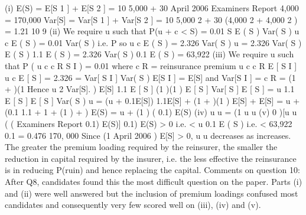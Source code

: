 \documentclass[a4paper,12pt]{article}
\begin{document}
(i)
E(S) = E[S 1 ] + E[S 2 ]
= 10 5,000 + 30
April 2006
Examiners Report
4,000 = 170,000
Var[S] = Var[S 1 ] + Var[S 2 ]
= 10 5,000 2 + 30 (4,000 2 + 4,000 2 )
= 1.21 10 9
(ii)
We require u such that
P(u + c < S) = 0.01
S E ( S )
Var( S )
u c E ( S )
= 0.01
Var( S )
i.e. P
so u c E ( S )
= 2.326
Var( S )
u = 2.326 Var( S )
E ( S ) 1.1 E ( S )
= 2.326 Var( S ) 0.1 E ( S )
= 63,922
(iii)
We require u such that
P ( u
c c R
S I ) = 0.01
where c R = reinsurance premium
u
c c R E [ S I ]
u c E [ S ]
= 2.326 =
Var[ S I ]
Var( S )
E[S I ] = E[S] and Var[S I ] =
c R = (1 + )(1
Hence
u
2 Var[S].
) E[S]
1.1 E [ S ] (1
)(1 ) E [ S ]
Var[ S ]
E [ S ]
=
u 1.1 E [ S ] E [ S ]
Var( S )
u = (u + 0.1E[S]) 1.1E[S] + (1 + )(1
) E[S] + E[S]
= u + (0.1 1.1 + 1
+ (1
) + ) E(S)
= u + (1
) (
0.1) E(S)
(iv)
u u = (1
u u
(v)
0
)[u
u
(
(
Examiners Report
0.1) E(S)]
0.1) E(S) > 0
i.e. < u
0.1
E ( S )
i.e. < 63,922
0.1 = 0.476
170, 000
Since (1
April 2006
) E[S] > 0, u
u decreases as increases.
The greater the premium loading required by the reinsurer, the smaller the reduction in capital required by the insurer, i.e. the less effective the reinsurance is in reducing P(ruin) and hence replacing the capital.
Comments on question 10: After Q8, candidates found this the most difficult question on the paper. Parts (i) and (ii) were well answered but the inclusion of premium loadings confused most candidates and consequently very few scored well on (iii), (iv) and (v).
\end{document}
